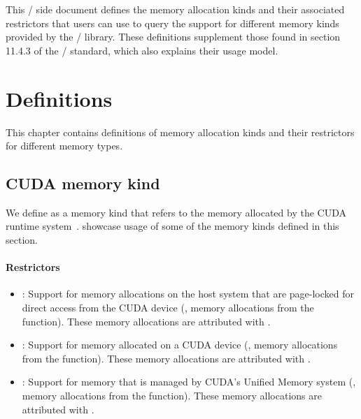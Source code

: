 This \mpi/ side document defines the memory allocation kinds and their
associated restrictors that users can use to query the support for
different memory kinds provided by the \mpi/ library. These definitions
supplement those found in section 11.4.3 of the \mpiivdoti/ standard, which
also explains their usage model.

\chapter{Definitions}
\label{chap:definitions}

This chapter contains definitions of memory allocation kinds and
their restrictors for different memory types.

\section{CUDA memory kind}

We define  as a memory kind that refers to the memory
allocated by the CUDA runtime system~\cite{cudaref}.
showcase usage of some of the memory kinds defined in this section.

\subsubsection{Restrictors}

\begin{itemize}

\item {}: Support for memory allocations on the host system
    that are page-locked for direct access from the CUDA device (\eg,
        memory allocations from the  function).
        These memory allocations are attributed with .

\item {}: Support for memory allocated on a CUDA device
    (\eg, memory allocations from the  function).
        These memory allocations are attributed with .

\item {}: Support for memory that is managed by CUDA’s
    Unified Memory system (\eg, memory allocations from the
         function).
        These memory allocations are attributed with .

\end{itemize}

